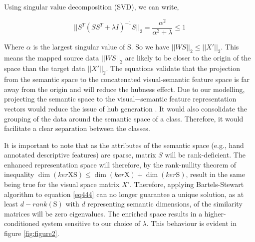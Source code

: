 \documentclass{article}
\begin{document}
Using singular value decomposition (SVD), we can write,

\begin{equation}
\label{eq888}
||S^T(SS^T+\lambda I)^{-1}S||_2 = \frac{\alpha^2}{\alpha^2 + \lambda} \leq 1
\end{equation}


Where $\alpha$ is the largest singular value of S. So we have $||WS||_2 \leq ||X'||_2$. This means the mapped source data
$||WS||_2$ are likely to be closer to the origin of the space than the target data $||X'||_2$. The equations validate that the projection from the semantic space to the concatenated visual-semantic feature space is far away from the origin and will reduce the hubness effect. Due to our modelling, projecting the semantic space to the visual$-$semantic feature representation vectors would reduce the issue of hub generation \cite{b28}. It would also consolidate the grouping of the data around the semantic space of a class. Therefore, it would facilitate a clear separation between the classes. 
\par It is important to note that as the attributes of the semantic space (e.g., hand annotated descriptive features) are sparse, matrix $S$ will be rank-deficient. The enhanced representation space will therefore, by the rank-nullity theorem of inequality $\dim (ker \mathrm{XS}) \leq  \dim (ker \mathrm{X}) + \dim(ker \mathrm{S}) $, result in the same being true for the visual space matrix $X'$. Therefore, applying Bartels-Stewart algorithm \cite{b50} to equation \ref{eq444} can no longer guarantee a unique solution, as at least $\mathrm{\textit{d}}-rank (\mathrm{S})$ with $d$ representing semantic dimensions, of the similarity matrices will be zero eigenvalues. The enriched space results in a higher-conditioned system sensitive to our choice of $\lambda$. This behaviour is evident in figure \ref{fig:figure2}.

\end{document}
